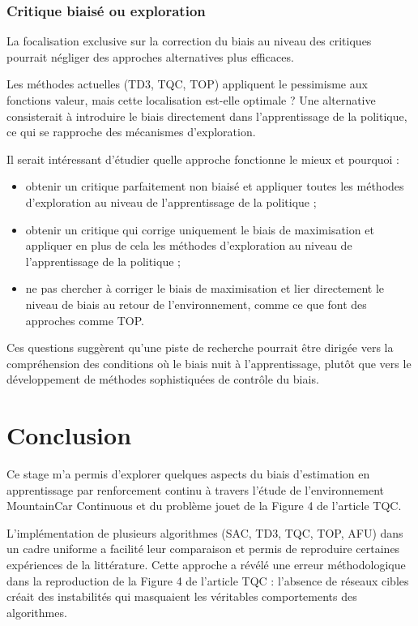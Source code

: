 \documentclass[a4paper, 12pt]{report}
\begin{document}
    \subsection{Critique biaisé ou exploration}

    La focalisation exclusive sur la correction du biais au niveau des
    critiques pourrait négliger des approches alternatives plus efficaces.

    Les méthodes actuelles (TD3, TQC, TOP) appliquent le pessimisme aux
    fonctions valeur, mais cette localisation est-elle optimale ? Une
    alternative consisterait à introduire le biais directement dans
    l'apprentissage de la politique, ce qui se rapproche des mécanismes
    d'exploration.

    Il serait intéressant d'étudier quelle approche fonctionne le mieux et pourquoi :
    
    \begin{itemize}
      \item obtenir un critique parfaitement non biaisé et appliquer toutes les méthodes d'exploration au niveau de l'apprentissage de la politique ;
      \item obtenir un critique qui corrige uniquement le biais de maximisation et appliquer en plus de cela les méthodes d'exploration au niveau de l'apprentissage de la politique ;
      \item ne pas chercher à corriger le biais de maximisation et lier directement le niveau de biais au retour de l'environnement, comme ce que font des approches comme TOP.
    \end{itemize}

    Ces questions suggèrent qu'une piste de recherche pourrait être dirigée vers
    la compréhension des conditions où le biais nuit à l'apprentissage, plutôt
    que vers le développement de méthodes sophistiquées de contrôle du biais.

    \chapter{Conclusion}

    Ce stage m'a permis d'explorer quelques aspects du biais d'estimation en
    apprentissage par renforcement continu à travers l'étude de l'environnement
    MountainCar Continuous et du problème jouet de la Figure 4 de l'article
    TQC.

    L'implémentation de plusieurs algorithmes (SAC, TD3, TQC, TOP, AFU) dans un
    cadre uniforme a facilité leur comparaison et permis de reproduire
    certaines expériences de la littérature. Cette approche a révélé une erreur
    méthodologique dans la reproduction de la Figure 4 de l'article TQC :
    l'absence de réseaux cibles créait des instabilités qui masquaient les
    véritables comportements des algorithmes.
    
\end{document}
